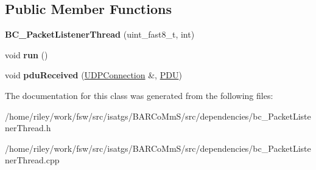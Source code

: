 \subsection*{Public Member Functions}
\begin{DoxyCompactItemize}
\item 
{\bfseries B\+C\+\_\+\+Packet\+Listener\+Thread} (uint\+\_\+fast8\+\_\+t, int)\hypertarget{class_b_c___packet_listener_thread_ab2b75706eb9cb7cf1765edb8a989690b}{}\label{class_b_c___packet_listener_thread_ab2b75706eb9cb7cf1765edb8a989690b}

\item 
void {\bfseries run} ()\hypertarget{class_b_c___packet_listener_thread_a07449138555f5a789192989f565f143c}{}\label{class_b_c___packet_listener_thread_a07449138555f5a789192989f565f143c}

\item 
void {\bfseries pdu\+Received} (\hyperlink{class_u_d_p_connection}{U\+D\+P\+Connection} \&, \hyperlink{class_p_d_u}{P\+DU})\hypertarget{class_b_c___packet_listener_thread_a86562b977acc43b809c1e2af3dfbf14a}{}\label{class_b_c___packet_listener_thread_a86562b977acc43b809c1e2af3dfbf14a}

\end{DoxyCompactItemize}


The documentation for this class was generated from the following files\+:\begin{DoxyCompactItemize}
\item 
/home/riley/work/fsw/src/isatgs/\+B\+A\+R\+Co\+Mm\+S/src/dependencies/bc\+\_\+\+Packet\+Listener\+Thread.\+h\item 
/home/riley/work/fsw/src/isatgs/\+B\+A\+R\+Co\+Mm\+S/src/dependencies/bc\+\_\+\+Packet\+Listener\+Thread.\+cpp\end{DoxyCompactItemize}
